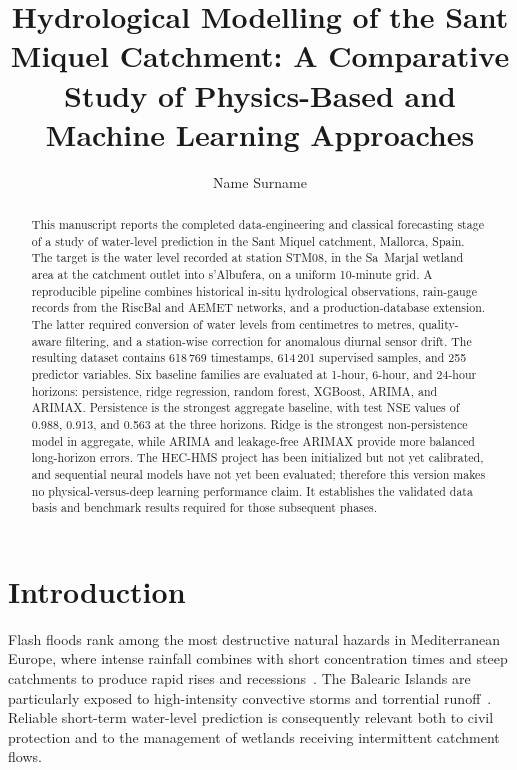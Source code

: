 \documentclass[twocolumn,twoside,a4paper,10pt]{IEEEtran}
\title{Hydrological Modelling of the Sant Miquel Catchment: A Comparative Study of Physics-Based and Machine Learning Approaches}
\author{Name Surname}
\begin{document}

\maketitle

\begin{abstract}
\noindent
This manuscript reports the completed data-engineering and classical
forecasting stage of a study of water-level prediction in the Sant Miquel
catchment, Mallorca, Spain. The target is the water level recorded at station
STM08, in the Sa~Marjal wetland area at the catchment outlet into
s'Albufera, on a uniform 10-minute grid. A reproducible pipeline combines
historical in-situ hydrological observations, rain-gauge records from the
RiscBal and AEMET networks, and a production-database extension. The latter
required conversion of water levels from centimetres to metres, quality-aware
filtering, and a station-wise correction for anomalous diurnal sensor drift.
The resulting dataset contains 618\,769 timestamps, 614\,201 supervised
samples, and 255 predictor variables. Six baseline families are evaluated at
1-hour, 6-hour, and 24-hour horizons: persistence, ridge regression, random
forest, XGBoost, ARIMA, and ARIMAX. Persistence is the strongest aggregate
baseline, with test NSE values of 0.988, 0.913, and 0.563 at the three
horizons. Ridge is the strongest non-persistence model in aggregate, while
ARIMA and leakage-free ARIMAX provide more balanced long-horizon errors. The
HEC-HMS project has been initialized but not yet calibrated, and sequential
neural models have not yet been evaluated; therefore this version makes no
physical-versus-deep learning performance claim. It establishes the validated
data basis and benchmark results required for those subsequent phases.
\end{abstract}

\section{Introduction\label{sec:intro}}

Flash floods rank among the most destructive natural hazards in Mediterranean
Europe, where intense rainfall combines with short concentration times and
steep catchments to produce rapid rises and recessions~\cite{Llasat2010}.
The Balearic Islands are particularly exposed to high-intensity convective
storms and torrential runoff~\cite{Estrany2010,Estrany2020,Estrany2025}. Reliable
short-term water-level prediction is consequently relevant both to civil
protection and to the management of wetlands receiving intermittent catchment
flows.
\end{document}
